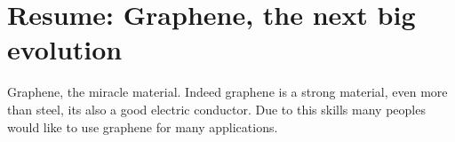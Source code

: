 \documentclass[a4paper,12pt]{report}
\author{Douaille Erwan}
\title{}
\begin{document}
\section*{Resume: Graphene, the next big evolution}

Graphene, the miracle material. Indeed graphene is a strong material, even more than steel, its also a good electric conductor. Due to this skills many peoples would like to use graphene for many applications.\\
\end{document}
